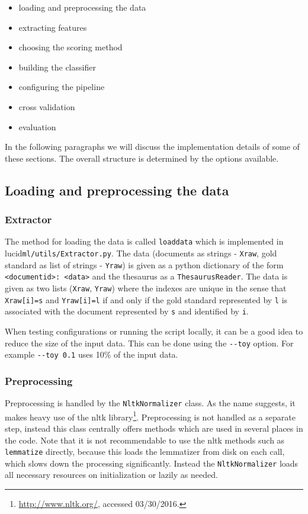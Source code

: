 \documentclass{article}
\begin{document}
\begin{itemize}
  \item loading and preprocessing the data
  \item extracting features
  \item choosing the scoring method
  \item building the classifier
  \item configuring the pipeline
  \item cross validation
  \item evaluation
\end{itemize}

In the following paragraphs we will discuss the implementation details of some of these sections.
The overall structure is determined by the options available.


\subsection{Loading and preprocessing the data}

\subsubsection{Extractor}
The method for loading the data is called \texttt{load\textunderscore data} which is implemented in lucid\textunderscore \texttt{ml/utils/Extractor.py}.
The data (documents as strings - \texttt{X\textunderscore raw}, gold standard as list of strings - \texttt{Y\textunderscore raw})
is given as a python dictionary of the form \texttt{<document\textunderscore id>: <data>} and the thesaurus as a \texttt{ThesaurusReader}.
The data is given as two lists (\texttt{X\textunderscore raw}, \texttt{Y\textunderscore raw}) where the indexes
are unique in the sense that \texttt{X\textunderscore raw[i]=s} and \texttt{Y\textunderscore raw[i]=l} if and only if the gold standard represented by
\texttt{l} is associated with the document represented by \texttt{s} and identified by \texttt{i}.

When testing configurations or running the script locally, it can be a good idea to reduce the size of the input data.
This can be done using the \texttt{{-}{-}toy} option.
For example \texttt{{-}{-}toy 0.1} uses 10\% of the input data.

\subsubsection{Preprocessing}
Preprocessing is handled by the \texttt{NltkNormalizer} class.
As the name suggests, it makes heavy use of the nltk library\footnote{
  \url{http://www.nltk.org/}, accessed 03/30/2016.
}.
Preprocessing is not handled as a separate step, instead this class centrally offers
methods which are used in several places in the code.
Note that it is not recommendable to use the nltk methods such as \texttt{lemmatize} directly,
because this loads the lemmatizer from disk on each call,
which slows down the processing significantly.
Instead the \texttt{NltkNormalizer} loads all necessary resources on initialization or lazily as needed.
\end{document}
